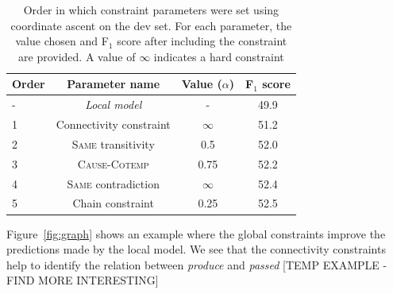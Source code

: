 \begin{table}[t]
{\footnotesize
\begin{tabular}{| l | c | c | c |}
\hline
    \textbf{Order} & \textbf{Parameter name} & \textbf{Value} ($\alpha$)& \textbf{F$_1$ score} \\
\hline
\hline
- & \emph{Local model} & - & 49.9 \\
1 & Connectivity constraint & $\infty$ & 51.2 \\
2 & \textsc{Same} transitivity &  0.5 & 52.0 \\
3 & \textsc{Cause}-\textsc{Cotemp} & 0.75 & 52.2\\
4 & \textsc{Same} contradiction & $\infty$ & 52.4\\
5 & Chain constraint & 0.25 & 52.5\\
\hline
\end{tabular}}
\caption{Order in which constraint parameters were set using coordinate ascent on the dev set. For each parameter, the value chosen and F$_1$ score after including the constraint are provided. A value of $\infty$ indicates a hard constraint}
\label{tab:paramtuning}
\end{table}

Figure~\ref{fig:graph} shows an example where the global constraints improve the predictions made by the local model. We see that the connectivity constraints help to identify the relation between \emph{produce} and \emph{passed} [TEMP EXAMPLE - FIND MORE INTERESTING]
